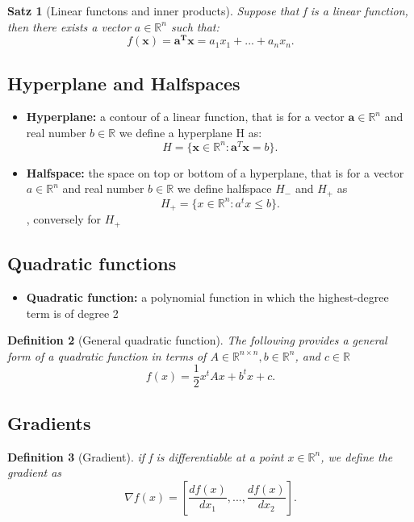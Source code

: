 \documentclass[11pt]{article}
\newtheorem{theorem}{Satz}
\newtheorem{definition}[theorem]{Definition}
\begin{document}
 \begin{theorem}[Linear functons and inner products]
    Suppose that f is a linear function, then there exists a vector $a\in\mathbb{R}^n$ such that:
    \[
    f(\mathbf{x}) = \mathbf{a^Tx}= a_1x_1 + ... + a_nx_n
    .\]  
    
 \end{theorem}


 \subsection*{Hyperplane and Halfspaces}
 \begin{itemize}
    \item \textbf{Hyperplane:} a contour of a linear function, that is for a vector $\mathbf{a}\in\mathbb{R}^n$ and real number $b\in \mathbb{R}$ we define a hyperplane H as: \[
    H = \{ \mathbf{x} \in \mathbb{R}^n: \mathbf{a}^T \mathbf{x} = b\}
    .\]    
    \item \textbf{Halfspace:} the space on top or bottom of a hyperplane, that is for a vector $a\in \mathbb{R}^n$ and real number $b\in \mathbb{R}$ we define halfspace $H_-$ and $H_+$ as \[
    H_+ = \{x \in \mathbb{R}^n : a^tx \leq b\}
    .\], conversely for $H_+$ 
    
 \end{itemize}

 \subsection*{Quadratic functions}
 \begin{itemize}
    \item \textbf{Quadratic function: } a polynomial function in which the highest-degree term is of degree 2
 \end{itemize}

 \begin{definition}[General quadratic function] The following provides a general form of a quadratic function in terms of $A\in\mathbb{R}^{n\times n}, b \in \mathbb{R}^n$, and $c\in \mathbb{R}$\[
 f(x) = \frac{1}{2}x^t Ax + b^t x + c
 .\]   
    
 \end{definition}
 
 \subsection*{Gradients}
 \begin{definition}[Gradient] if f is differentiable at a point $x \in \mathbb{R}^n$, we define the gradient as
    \[
    \nabla f(x) = [ \frac{df(x)}{dx_1}, ..., \frac{df(x)}{dx_2}]
    .\]  
    
 \end{definition} %
 
\end{document}
